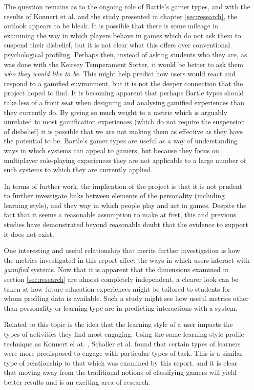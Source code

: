 \documentclass[12pt,a4paper,twoside]{report}
\begin{document}
The question remains as to the ongoing role of Bartle's gamer types, and with the results of Konnert et al. \cite{konertmodeling} and the study presented in chapter \ref{sec:research}, the outlook appears to be bleak. It is possible that there is some mileage in examining the way in which players behave in games which do not ask them to suspend their disbelief, but it is not clear what this offers over conventional psychological profiling. Perhaps then, instead of asking students who they are, as was done with the Keirsey Temperament Sorter, it would be better to ask them \textit{who they would like to be}. This might help predict how users would react and respond to a gamified environment, but it is not the deeper connection that the project hoped to find. It is becoming apparent that perhaps Bartle types should take less of a front seat when designing and analysing gamified experiences than they currently do. By giving so much weight to a metric which is arguably unrelated to most gamification experiences (which do not require the suspension of disbelief) it is possible that we are not making them as effective as they have the potential to be. Bartle's gamer types are useful as a way of understanding ways in which systems can appeal to gamers, but because they focus on multiplayer role-playing experiences they are not applicable to a large number of such systems to which they are currently applied.

In terms of further work, the implication of the project is that it is not prudent to further investigate links between elements of the personality (including learning style), and they way in which people play and act in games. Despite the fact that it seems a reasonable assumption to make at first, this and previous studies have demonstrated beyond reasonable doubt that the evidence to support it does not exist.

One interesting and useful relationship that merits further investigation is how the metrics investigated in this report affect the ways in which users interact with \textit{gamified} systems. Now that it is apparent that the dimensions examined in section \ref{sec:research} are almost completely independent, a clearer look can be taken at how future education experiences might be tailored to students for whom profiling data is available. Such a study might see how useful metrics other than personality or learning type are in predicting interactions with a system.

Related to this topic is the idea that the learning style of a user impacts the types of activities they find most engaging. Using the same learning style profile technique as Konnert el at. \cite{konertmodeling}, Schaller et al. \cite{one-size} found that certain types of learners were more predisposed to engage with particular types of task. This is a similar type of relationship to that which was examined by this report, and it is clear that moving away from the traditional notions of classifying gamers will yield better results and is an exciting area of research.
\end{document}
